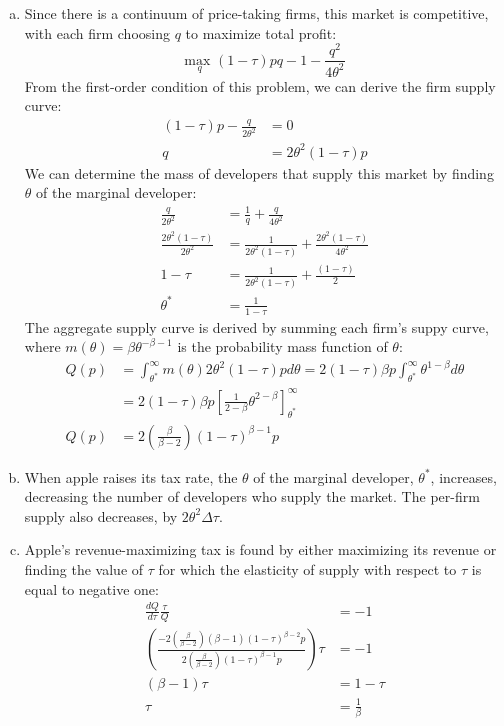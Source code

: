 \documentclass{article}
\newcommand{\usmax}[1]{\underset{#1}{\text{max }}}
\begin{document}
\begin{enumerate}[(a)]
	\item Since there is a continuum of price-taking firms, this market is competitive, with each firm choosing $q$ to maximize total profit:
		\[
			\usmax{q}(1-\tau) pq - 1 - \frac{q^2}{4\theta^2}
		\]
		From the first-order condition of this problem, we can derive the firm supply curve:
		\begin{align*}
			(1-\tau)p - \frac{q}{2\theta^2} &= 0	\\
			q &= 2\theta^2(1-\tau)p
		\end{align*}
		We can determine the mass of developers that supply this market by finding $\theta$ of the marginal developer:
		\begin{align*}
			\frac{q}{2\theta^2} 				&= \frac{1}{q} + \frac{q}{4\theta^2}									\\
			\frac{2\theta^2(1-\tau)}{2\theta^2} &= \frac{1}{2\theta^2(1-\tau)} + \frac{2\theta^2(1-\tau)}{4\theta^2}	\\
										1-\tau	&= \frac{1}{2\theta^2(1-\tau)} + \frac{(1-\tau)}{2}						\\
									\theta^* 	&= \frac{1}{1-\tau}
		\end{align*}
		The aggregate supply curve is derived by summing each firm's suppy curve, where ${m(\theta)=\beta\theta^{-\beta-1}}$ is the probability mass function of $\theta$:
		\begin{align*}
			Q(p) 	&= \int_{\theta^*}^\infty m(\theta) 2\theta^2(1-\tau) pd\theta = 2(1-\tau)\beta p\int_{\theta^*}^\infty \theta^{1-\beta}d\theta	\\
					&= 2(1-\tau)\beta p\left[\frac{1}{2-\beta}\theta^{2-\beta}\right]^\infty_{\theta^*}												\\
			Q(p) 	&= 2\left(\frac{\beta}{\beta-2}\right)(1-\tau)^{\beta-1}p
		\end{align*}
	
	\item When apple raises its tax rate, the $\theta$ of the marginal developer, $\theta^*$, increases, decreasing the number of developers who supply the market. The per-firm supply also decreases, by $2\theta^2\Delta\tau$.
	
	\item Apple's revenue-maximizing tax is found by either maximizing its revenue or finding the value of $\tau$ for which the elasticity of supply with respect to $\tau$ is equal to negative one:
		\begin{align*}
																															\frac{dQ}{d\tau}\frac{\tau}{Q}	&= -1		\\
		\left(\frac{-2\left(\frac{\beta}{\beta-2}\right)(\beta-1)(1-\tau)^{\beta-2}p}{2\left(\frac{\beta}{\beta-2}\right)(1-\tau)^{\beta-1}p}\right)\tau 	&= -1		\\
																																			(\beta-1)\tau	&= 1-\tau	\\
																																			\tau	&= \frac{1}{\beta}
		\end{align*}
	

\end{enumerate}
\end{document}
